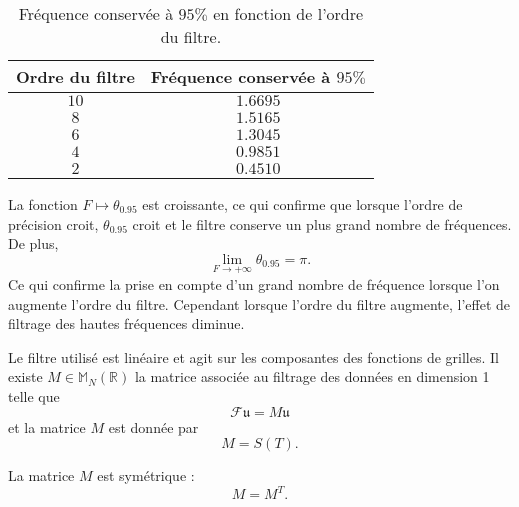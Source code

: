 \begin{table}
\begin{center}
\begin{tabular}{|c||c|}
\hline
\textbf{Ordre du filtre} & \textbf{Fréquence conservée à } $95\%$\\
\hline
\hline
$10$&$1.6695$\\
$8$&$1.5165$\\
$6$&$1.3045$\\
$4$&$0.9851$\\
$2$&$0.4510$\\
\hline
\end{tabular}
\end{center}
\caption{Fréquence conservée à $95\%$ en fonction de l'ordre du filtre.}
\label{tab:filter_095}
\end{table}

La fonction $F \mapsto \theta_{0.95}$ est croissante, ce qui confirme que lorsque l'ordre de précision croit, $\theta_{0.95}$ croit et le filtre conserve un plus grand nombre de fréquences. De plus, 
\begin{equation}
\lim_{F \rightarrow +\infty} \theta_{0.95} = \pi.
\end{equation}
Ce qui confirme la prise en compte d'un grand nombre de fréquence lorsque l'on augmente l'ordre du filtre. Cependant lorsque l'ordre du filtre augmente, l'effet de filtrage des hautes fréquences diminue.

Le filtre utilisé est linéaire et agit sur les composantes des fonctions de grilles. Il existe $M \in \mathbb{M}_N \left( \mathbb{R} \right)$ la matrice associée au filtrage des données en dimension 1 telle que
\begin{equation}
\mathcal{F} \mathfrak{u} = M \mathfrak{u}
\end{equation}
et la matrice $M$ est donnée par
\begin{equation}
M = S(T).
\label{eq:matrice_filtrage}
\end{equation}

\begin{proposition}
La matrice $M$ est symétrique :
\begin{equation}
M = M^T.
\end{equation}
\end{proposition}
































